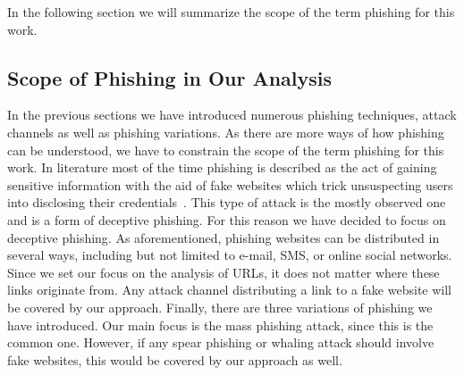  In the following section we will summarize the scope of the term phishing for this work.
\subsection{Scope of Phishing in Our Analysis}
\label{s:scope}
In the previous sections we have introduced numerous phishing techniques, attack channels as well as phishing variations. As there are more ways of how phishing can be understood, we have to constrain the scope of the term phishing for this work. In literature most of the time phishing is described as the act of gaining sensitive information with the aid of fake websites which trick unsuspecting users into disclosing their credentials~\cite{sheng2007antiphishingphil, antiphishingtrendreport2013, kasperskyreport2013}.
This type of attack is the mostly observed one and is a form of deceptive phishing. For this reason we have decided to focus on deceptive phishing. As aforementioned, phishing websites can be distributed in several ways, including but not limited to e-mail, SMS, or online social networks. Since we set our focus on the analysis of URLs, it does not matter where these links originate from. Any attack channel distributing a link to a fake website will be covered by our approach. Finally, there are three variations of phishing we have introduced. Our main focus is the mass phishing attack, since this is the common one. However, if any spear phishing or whaling attack should involve fake websites, this would be covered by our approach as well.

